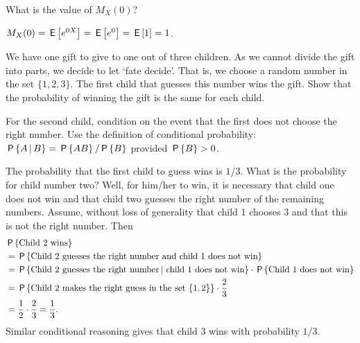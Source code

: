 \documentclass[queueing-book.tex]{subfiles}
\begin{document}
\begin{exercise}
 What is the value of $M_X(0)$?
\begin{solution}
 $M_X(0) = \E{e^{0 X}} = \E{e^0} = \E{1} = 1$.
\end{solution}
\end{exercise}

\begin{exercise}\label{ex:l-109}
 We have one gift to give to one out of three children. As we cannot
 divide the gift into parts, we decide to let `fate decide'. That
 is, we choose a random number in the set $\{1, 2, 3\}$. The first
 child that guesses this number wins the gift. Show that the
 probability of winning the gift is the same for each child.
\begin{hint}
 For the second child, condition on the event that the first does not choose the right number.
 Use the definition of conditional probability:
 $\P{A\given B} = \P{AB}/\P{B}$ provided $\P{B}>0$.
\end{hint}
\begin{solution}
 The probability that the first child to guess  wins is
 $1/3$. What is the probability for child number two? Well, for
 him/her to win, it is necessary that child one does not win and
 that child two guesses the right number of the remaining
 numbers. Assume, without loss of generality that child 1 chooses
 $3$ and that this is not the right number. Then
 \begin{equation*}
 \begin{split}
&\P{\text{Child 2 wins}} \\
&= \P{\text{Child 2 guesses the right number and child 1 does not win}} \\
&= \P{\text{Child 2 guesses the right number} \given\, \text{child 1 does not win}}
\cdot \P{\text{Child 1 does not win}} \\
&= \P{\text{Child 2 makes the right guess in the set $\{1,2\}$}}\cdot \frac 23 \\
&= \frac 1 2\cdot \frac 23 = \frac 1 3.
 \end{split}
 \end{equation*}
 Similar conditional reasoning gives that child 3 wins with probability $1/3$.
\end{solution}
\end{exercise}


\end{document}
